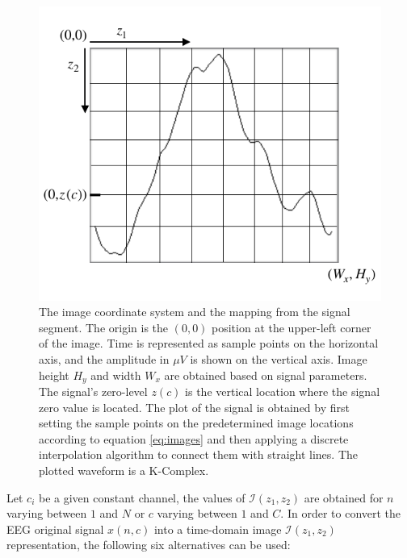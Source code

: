 \begin{figure}[h!]
\centering
\includegraphics[scale=1.2]{images/imagecoordinatesystem.pdf}
\caption[Image Coordinate System]{The image coordinate system and the mapping from the signal segment.  The origin is the $(0,0)$ position at the upper-left corner of the image.  Time is represented as sample points on the horizontal axis, and the amplitude in $\mu V$ is shown on the vertical axis. Image height $H_y$ and width $W_x$ are obtained based on signal parameters.  The signal's zero-level $z(c)$ is the vertical location where the signal zero value is located. The plot of the signal is obtained by first setting the sample points on the predetermined image locations according to equation \ref{eq:images} and then applying a discrete interpolation algorithm to connect them with straight lines. The plotted waveform is a K-Complex.}
\label{fig:imagecoordinatesystem}
\end{figure}


Let $c_i$ be a given constant channel, the values of $\mathcal{I}(z_1,z_2)$ are obtained for $n$ varying between $1$ and $N$ or $c$ varying between $1$ and $C$.   In order to convert the EEG original signal $x(n,c)$ into a time-domain image $\mathcal{I}(z_1,z_2)$ representation, the following six alternatives can be used:

